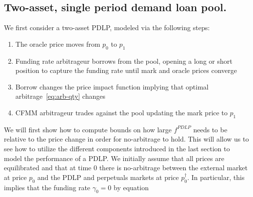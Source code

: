 \subsection{Two-asset, single period demand loan pool.} 
We first consider a two-asset PDLP, modeled via the following steps:
\begin{enumerate}
    \item The oracle price moves from $p_0$ to $p_1$
    \item Funding rate arbitrageur borrows from the pool, opening a long or short position to capture the funding rate until mark and oracle prices converge
    \item Borrow changes the price impact function implying that optimal arbitrage~\eqref{eq:arb-qty} changes
    \item CFMM arbitrageur trades against the pool updating the mark price to $p_1$
\end{enumerate}
We will first show how to compute bounds on how large $f^{PDLP}$ needs to be relative to the price change in order for no-arbitrage to hold.
This will allow us to see how to utilize the different components introduced in the last section to model the performance of a PDLP.
We initially assume that all prices are equilibrated and that at time $0$ there is no-arbitrage between the external market at price $p_0$ and the PDLP and perpetuals markets at price $p^{\dagger}_0$.
In particular, this implies that the funding rate $\gamma_0 = 0$ by equation~


